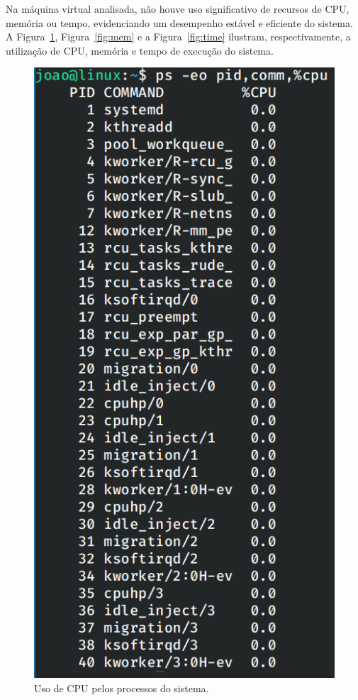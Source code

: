 \documentclass[
	12pt,				%
	oneside,   	        %
	a4paper,			%
	english,			%
	french,				%
	spanish,			%
	brazil,				%
	]{pacotes/abntex2}
\begin{document}
Na máquina virtual analisada, não houve uso significativo de recursos de CPU, memória ou tempo, evidenciando um desempenho estável e eficiente do sistema. A Figura~\ref{fig:cpu}, Figura~\ref{fig:mem} e a Figura~\ref{fig:time} ilustram, respectivamente, a utilização de CPU, memória e tempo de execução do sistema.

\begin{figure}[H]
  \centering
  \includegraphics[scale=0.45]{figuras/cpu.png}
  \caption{Uso de CPU pelos processos do sistema.}
  \label{fig:cpu}
\end{figure}
\end{document}
